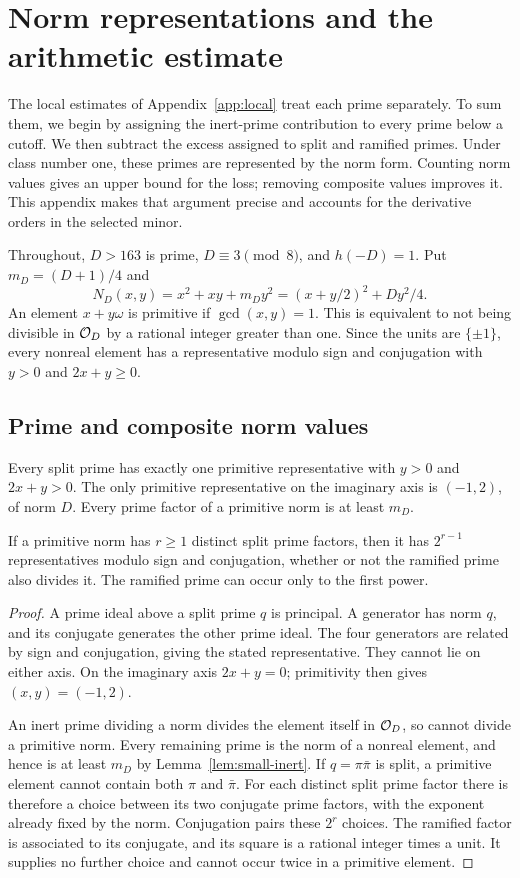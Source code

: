 \section{Norm representations and the arithmetic estimate}\label{app:arithmetic}
The local estimates of Appendix~\ref{app:local} treat each prime separately.
To sum them, we begin by assigning the inert-prime contribution to every
prime below a cutoff. We then subtract the excess assigned to split and
ramified primes. Under class number one, these primes are represented by
the norm form. Counting norm values gives an upper bound for the loss;
removing composite values improves it. This appendix makes that argument
precise and accounts for the derivative orders in the selected minor.

Throughout, $D>163$ is prime, $D\equiv3\pmod8$, and $h(-D)=1$.
Put $m_D=(D+1)/4$ and
\[
 N_D(x,y)=x^2+xy+m_Dy^2
        =(x+y/2)^2+Dy^2/4.
\]
An element $x+y\omega$ is primitive if $\gcd(x,y)=1$. This is equivalent
to not being divisible in $\mathcal O_D$ by a rational integer greater than one.
Since the units are $\{\pm1\}$, every nonreal element has a representative
modulo sign and conjugation with $y>0$ and $2x+y\geq0$.

\subsection{Prime and composite norm values}\label{app:norm-products}
\begin{lemma}\label{lem:primitive-norms}
Every split prime has exactly one primitive representative with
$y>0$ and $2x+y>0$. The only primitive representative on the imaginary
axis is $(-1,2)$, of norm $D$. Every prime factor of a primitive norm
is at least $m_D$.

If a primitive norm has $r\geq1$ distinct split prime factors, then
it has $2^{r-1}$ representatives modulo sign and conjugation, whether
or not the ramified prime also divides it. The ramified prime can occur
only to the first power.
\end{lemma}
\begin{proof}
A prime ideal above a split prime $q$ is principal. A generator has norm
$q$, and its conjugate generates the other prime ideal. The four generators
are related by sign and conjugation, giving the stated representative.
They cannot lie on either axis. On the imaginary axis $2x+y=0$;
primitivity then gives $(x,y)=(-1,2)$.

An inert prime dividing a norm divides the element itself in $\mathcal O_D$,
so cannot divide a primitive norm. Every remaining prime is the norm of
a nonreal element, and hence is at least $m_D$ by
Lemma~\ref{lem:small-inert}. If $q=\pi\bar\pi$ is split, a primitive
element cannot contain both $\pi$ and $\bar\pi$. For each distinct split
prime factor there is therefore a choice between its two conjugate prime
factors, with the exponent already fixed by the norm. Conjugation pairs
these $2^r$ choices. The ramified factor is associated to its conjugate,
and its square is a rational integer times a unit. It supplies no further
choice and cannot occur twice in a primitive element.
\end{proof}

